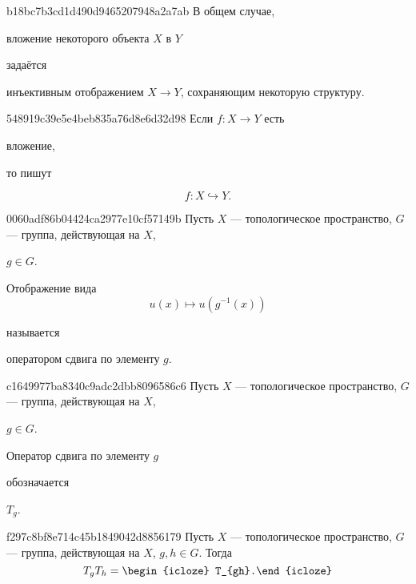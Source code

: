 \begin{note}{b18bc7b3cd1d490d9465207948a2a7ab}
    В общем случае, \begin{icloze}{2}вложение некоторого объекта \({ X }\) в \({ Y }\)\end{icloze} задаётся \begin{icloze}{1}инъективным отображением \({ X \to Y }\), сохраняющим некоторую структуру.\end{icloze}
\end{note}

\begin{note}{548919c39e5e4beb835a76d8e6d32d98}
    Если \({ f : X \to Y }\) есть \begin{icloze}{2}вложение,\end{icloze} то пишут
    \begin{icloze}{1}
        \[
            f : X \hookrightarrow Y.
        \]
    \end{icloze}
\end{note}

\begin{note}{0060adf86b04424ca2977e10cf57149b}
    Пусть \({ X }\) --- топологическое пространство, \({ G }\) --- группа, действующая на \({ X }\),\: \begin{icloze}{3}\({ g \in G }\).\end{icloze}
    \begin{icloze}{2}
        Отображение вида
        \[
            u(x) \mapsto u(g^{-1}(x))
        \]
    \end{icloze}
    называется \begin{icloze}{1}оператором сдвига по элементу \({ g }\).\end{icloze}
\end{note}

\begin{note}{c1649977ba8340c9adc2dbb8096586c6}
    Пусть \({ X }\) --- топологическое пространство, \({ G }\) --- группа, действующая на \({ X }\),\: \begin{icloze}{3}\({ g \in G }\).\end{icloze}
    \begin{icloze}{2}Оператор сдвига по элементу \({ g }\)\end{icloze} обозначается \begin{icloze}{1}\({ T_{g} }\).\end{icloze}
\end{note}

\begin{note}{f297c8bf8e714c45b1849042d8856179}
    Пусть \({ X }\) --- топологическое пространство, \({ G }\) --- группа, действующая на \({ X }\),\: \({ g, h \in G }\).
    Тогда
    \[
        T_{g}T_{h} = \begin{icloze}{1}T_{gh}.\end{icloze}
    \]
\end{note}


